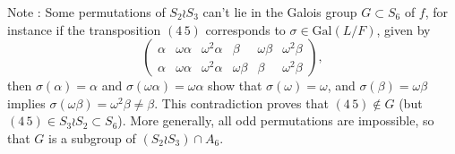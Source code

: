 \documentclass[11pt,a4paper]{article}
\newcommand{\Gal}{\mathrm{Gal}}
\begin{document}
Note : Some permutations of $S_2\wr S_3$ can't lie in the Galois group $G \subset S_6$ of $f$, for instance if the transposition $(4\,5)$ corresponds to $\sigma \in \Gal(L/F)$, given by
$$
\left(
\begin{array}{cccccc}
\alpha & \omega\alpha &\omega^2\alpha & \beta & \omega \beta & \omega^2 \beta\\
\alpha & \omega\alpha &\omega^2\alpha & \omega\beta &  \beta & \omega^2 \beta
\end{array}
\right),
$$
then $\sigma(\alpha) = \alpha$ and $\sigma(\omega \alpha) = \omega \alpha$ show that $\sigma(\omega) = \omega$, and $\sigma(\beta) = \omega \beta$ implies $\sigma(\omega \beta) = \omega^2 \beta \ne \beta$. This contradiction proves that $(4\,5) \not \in G$ (but $(4\, 5) \in S_3 \wr S_2 \subset S_6$). More generally, all odd permutations are impossible, so that $G$ is a subgroup of $(S_2\wr S_3) \cap A_6$.
\end{document}

